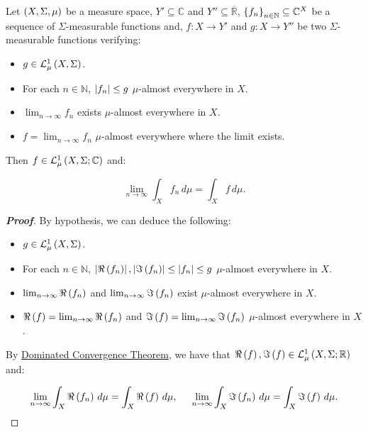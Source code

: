 \begin{theorem}
  Let $\left(X,\Sigma,\mu\right)$ be a measure space, $Y'\subseteq\mathbb{C}$ and $Y''\subseteq\overline{\mathbb{R}}$, $\left\{f_n\right\}_{n\in\mathbb{N}}\subseteq\mathbb{C}^X$ be a sequence of $\Sigma$-measurable functions and, $f:X\rightarrow Y'$ and $g:X\rightarrow Y''$ be two $\Sigma$-measurable functions verifying:

  \begin{itemize}
    \item $g\in\mathcal{L}^1_{\mu}\left(X,\Sigma\right)$.
    \item For each $n\in\mathbb{N}$, $\left|f_n\right|\leq g$ $\mu$-almost everywhere in $X$.
    \item $\lim_{n\to\infty}{f_n}$ exists $\mu$-almost everywhere in $X$.
    \item $f=\lim_{n\to\infty}{f_n}$ $\mu$-almost everywhere where the limit exists.
  \end{itemize}

  Then $f\in\mathcal{L}^1_{\mu}\left(X,\Sigma;\mathbb{C}\right)$ and:

  \begin{equation}
    \lim_{n\to\infty}{\int_{X}{f_n\,d\mu}}=\int_{X}{f\,d\mu}.
  \end{equation}
  \begin{proof}[\rm\textbf{Proof}]
    By hypothesis, we can deduce the following:

    \begin{itemize}
      \item $g\in\mathcal{L}^1_{\mu}\left(X,\Sigma\right)$.
      \item For each $n\in\mathbb{N}$, $\left|\Re\left(f_n\right)\right|,\left|\Im\left(f_n\right)\right|\leq\left|f_n\right|\leq g$ $\mu$-almost everywhere in $X$.
      \item $\lim_{n\to\infty}{\Re\left(f_n\right)}$ and $\lim_{n\to\infty}{\Im\left(f_n\right)}$ exist $\mu$-almost everywhere in $X$.
      \item $\Re\left(f\right)=\lim_{n\to\infty}{\Re\left(f_n\right)}$ and $\Im\left(f\right)=\lim_{n\to\infty}{\Im\left(f_n\right)}$ $\mu$-almost everywhere in $X$.
    \end{itemize}

    By \hyperref[Dominated Convergence Theorem]{Dominated Convergence Theorem}, we have that $\Re\left(f\right),\Im\left(f\right)\in\mathcal{L}^1_{\mu}\left(X,\Sigma;\mathbb{R}\right)$ and:

    \begin{equation}
      \lim_{n\to\infty}{\int_{X}{\Re\left(f_n\right)\,d\mu}}=\int_{X}{\Re\left(f\right)\,d\mu},\hspace{0.5cm}\lim_{n\to\infty}{\int_{X}{\Im\left(f_n\right)\,d\mu}}=\int_{X}{\Im\left(f\right)\,d\mu}.
    \end{equation}


\end{proof}
\end{theorem}
